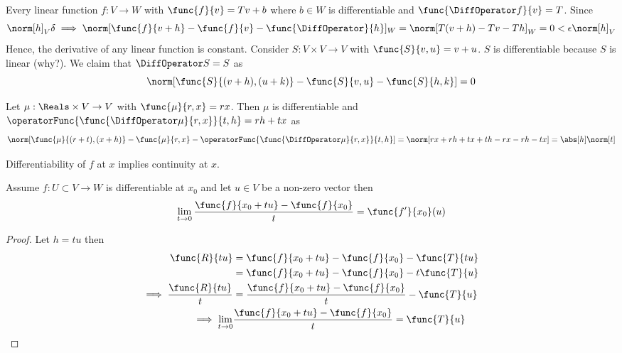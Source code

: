 \begin{example}
    Every linear function \(f : V \to W\) with \(\func{f}{v} = Tv + b\) where \(b \in W\) is differentiable and \(\func{\DiffOperator f}{v} = T\). Since
    \begin{equation*}
        \norm[h]_V \delta \implies \norm[\func{f}{v + h} - \func{f}{v} - \func{\DiffOperator}{h}]_W = \norm[T(v+h) - Tv - Th]_W = 0 < \epsilon \norm[h]_V
    \end{equation*}
    Hence, the derivative of any linear function is constant.
    Consider \(S : V \times V \to V\) with \(\func{S}{v,u} = v + u\). \(S\) is differentiable because \(S\) is linear (why?). We claim that \(\DiffOperator S = S\) as
    \begin{equation*}
        \norm[\func{S}{(v + h),(u + k)} - \func{S}{v,u} - \func{S}{h,k}] = 0
    \end{equation*}
\end{example}

\begin{example}
    Let \(\mu : \Reals \times V \to V\) with \(\func{\mu}{r,x} = rx\). Then \(\mu\) is differentiable and \(\operatorFunc{\func{\DiffOperator \mu}{r,x}}{t,h} = rh + tx\) as
    \begin{equation*}
        \norm[\func{\mu}{(r + t),(x + h)} - \func{\mu}{r,x} - \operatorFunc{\func{\DiffOperator \mu}{r,x}}{t,h}] = \norm[rx + rh + tx + th - rx - rh - tx] = \abs[h] \norm[t]
    \end{equation*}
\end{example}

\begin{proposition}
    Differentiability of \(f\) at \(x\) implies continuity at \(x\).
\end{proposition}

\begin{proposition} \label{eq:partialDerivative}
    Assume \(f: U \subset V \to W\) is differentiable at \(x_0\) and let \(u \in V\) be a non-zero vector then
    \begin{equation*}
        \lim_{t \to 0} \dfrac{\func{f}{x_0 + tu} - \func{f}{x_0}}{t} =\func{f'}{x_0} (u)
    \end{equation*}
\end{proposition}

\begin{proof}
    Let \(h = tu\) then
    \begin{align*}
        \func{R}{tu}                     & = \func{f}{x_0 + tu} - \func{f}{x_0} - \func{T}{tu}            \\
                                         & = \func{f}{x_0 + tu} - \func{f}{x_0} - t\func{T}{u}            \\
        \implies \dfrac{\func{R}{tu}}{t} & = \dfrac{ \func{f}{x_0 + tu} - \func{f}{x_0}}{t} - \func{T}{u} \\
        \implies \lim_{t \to 0}          & \dfrac{ \func{f}{x_0 + tu} - \func{f}{x_0}}{t} = \func{T}{u}
    \end{align*}
\end{proof}

